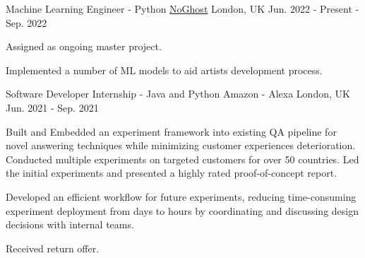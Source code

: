 

\begin{cventries}
  \cventry
  {Machine Learning Engineer - Python} %
  {\href{https://www.noghost.co.uk/}{NoGhost}} %
  {London, UK} %
  {Jun. 2022 - Present - Sep. 2022} %
  {
    \begin{cvitems} %
      \item {Assigned as ongoing master project.}
      \item {Implemented a number of ML models to aid artists development process.}
    \end{cvitems}
  }

  \cventry
    {Software Developer Internship - Java and Python} %
    {Amazon - Alexa} %
    {London, UK} %
    {Jun. 2021 - Sep. 2021} %
    {
      \begin{cvitems} %
        \item {Built and Embedded an experiment framework into existing QA pipeline for novel answering techniques while minimizing customer experiences deterioration. Conducted multiple experiments on targeted customers for over 50 countries. Led the initial experiments and presented a highly rated proof-of-concept report.}
        \item {Developed an efficient workflow for future experiments, reducing time-consuming experiment deployment from days to hours by coordinating and discussing design decisions with internal teams.}
        \item {Received return offer.}
      \end{cvitems}
    }


\end{cventries}
